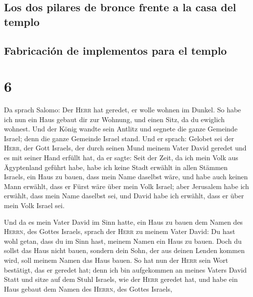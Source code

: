 \hypertarget{los-dos-pilares-de-bronce-frente-a-la-casa-del-templo}{%
\subsection{Los dos pilares de bronce frente a la casa del
templo}\label{los-dos-pilares-de-bronce-frente-a-la-casa-del-templo}}

\hypertarget{fabricaciuxf3n-de-implementos-para-el-templo}{%
\subsection{Fabricación de implementos para el
templo}\label{fabricaciuxf3n-de-implementos-para-el-templo}}

\hypertarget{section-5}{%
\section{6}\label{section-5}}

 Da sprach Salomo: Der \textsc{Herr} hat geredet, er wolle
wohnen im Dunkel.  So habe ich nun ein Haus gebaut dir zur
Wohnung, und einen Sitz, da du ewiglich wohnest.  Und der
König wandte sein Antlitz und segnete die ganze Gemeinde Israel; denn
die ganze Gemeinde Israel stand.  Und er sprach: Gelobet
sei der \textsc{Herr}, der Gott Israels, der durch seinen Mund meinem
Vater David geredet und es mit seiner Hand erfüllt hat, da er sagte:
 Seit der Zeit, da ich mein Volk aus Ägyptenland geführt
habe, habe ich keine Stadt erwählt in allen Stämmen Israels, ein Haus zu
bauen, dass mein Name daselbst wäre, und habe auch keinen Mann erwählt,
dass er Fürst wäre über mein Volk Israel;  aber Jerusalem
habe ich erwählt, dass mein Name daselbst sei, und David habe ich
erwählt, dass er über mein Volk Israel sei.

 Und da es mein Vater David im Sinn hatte, ein Haus zu
bauen dem Namen des \textsc{Herrn}, des Gottes Israels, 
sprach der \textsc{Herr} zu meinem Vater David: Du hast wohl getan, dass
du im Sinn hast, meinem Namen ein Haus zu bauen.  Doch du
sollst das Haus nicht bauen, sondern dein Sohn, der aus deinen Lenden
kommen wird, soll meinem Namen das Haus bauen.  So hat
nun der \textsc{Herr} sein Wort bestätigt, das er geredet hat; denn ich
bin aufgekommen an meines Vaters David Statt und sitze auf dem Stuhl
Israels, wie der \textsc{Herr} geredet hat, und habe ein Haus gebaut dem
Namen des \textsc{Herrn}, des Gottes Israels,

